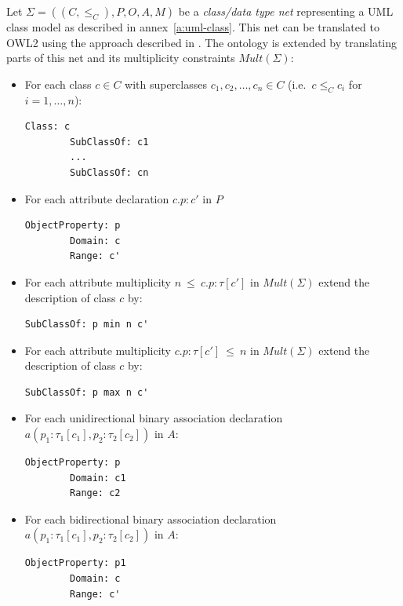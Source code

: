 \documentclass[10pt, a4paper]{isov2}
\begin{document}
Let $\Sigma = ((C, {\leq_C}), P, O, A, M)$ be a \emph{class/data type net} representing a UML 
class model as described in annex~\ref{a:uml-class}. This net can be translated to OWL2 using the approach described in \cite{zedlitz2012uml}.
The ontology is extended by translating parts of this net and its multiplicity constraints $\mathit{Mult}(\Sigma)$:
 \begin{itemize} 
\item For each class $c \in C$ with superclasses $c_1,c_2,\ldots,c_n \in C$ (i.e.\ $c \leq_C c_i$ for $i=1,\ldots,n$):
\begin{lstlisting}[language=owl2Manchester]
	Class: c
		SubClassOf: c1
		...
		SubClassOf: cn
\end{lstlisting}
\item For each attribute declaration $c.p:c'$ in $P$
\begin{lstlisting}[language=owl2Manchester]
	ObjectProperty: p
		Domain: c
		Range: c'
\end{lstlisting}

\item For each attribute multiplicity $n\ \mathsf{\leq}\ c.p:\tau[c']$ in $\mathit{Mult}(\Sigma)$ extend the description of class $c$ by:
\begin{lstlisting}[language=owl2Manchester]
	SubClassOf: p min n c'
\end{lstlisting}

\item For each attribute multiplicity $ c.p:\tau[c'] \ \mathsf{\leq}\ n$  in $\mathit{Mult}(\Sigma)$ extend the description of class $c$ by:
\begin{lstlisting}[language=owl2Manchester]
	SubClassOf: p max n c'
\end{lstlisting}

\item For each unidirectional binary association declaration $a(p_1:\tau_1[c_1],p_2:\tau_2[c_2])$ in $A$:
\begin{lstlisting}[language=owl2Manchester]
	ObjectProperty: p
		Domain: c1
		Range: c2
\end{lstlisting}
\item For each bidirectional binary association declaration $a(p_1:\tau_1[c_1],p_2:\tau_2[c_2])$ in $A$:
\begin{lstlisting}[language=owl2Manchester]
	ObjectProperty: p1
		Domain: c
		Range: c'


\end{lstlisting}
\end{itemize}
\end{document}
